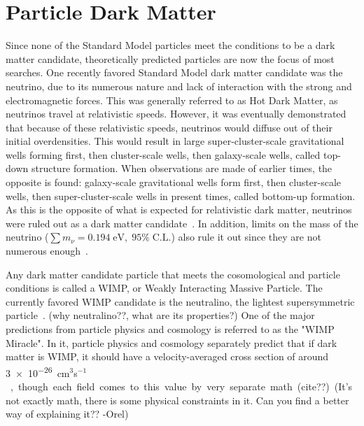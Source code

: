 \section{Particle Dark Matter}\label{sec_particledm}

  Since none of the Standard Model particles meet the conditions to be a dark matter candidate, theoretically predicted particles are now the focus of most searches.
  One recently favored Standard Model dark matter candidate was the neutrino, due to its numerous nature and lack of interaction with the strong and electromagnetic forces.
  This was generally referred to as Hot Dark Matter, as neutrinos travel at relativistic speeds.
  However, it was eventually demonstrated that because of these relativistic speeds, neutrinos would diffuse out of their initial overdensities.
  This would result in large super-cluster-scale gravitational wells forming first, then cluster-scale wells, then galaxy-scale wells, called top-down structure formation.
  When observations are made of earlier times, the opposite is found: galaxy-scale gravitational wells form first, then cluster-scale wells, then super-cluster-scale wells in present times, called bottom-up formation.
  As this is the opposite of what is expected for relativistic dark matter, neutrinos were ruled out as a dark matter candidate~\cite{neutrinoHeirarchical}.
  In addition, limits on the mass of the neutrino ($\sum{}m_{\nu} = 0.194 \; \textrm{eV}, \; 95\% \; \textrm{C.L.}$) also rule it out since they are not numerous enough~\cite{planck2015}.
  
  
  Any dark matter candidate particle that meets the cosomological and particle conditions is called a WIMP, or Weakly Interacting Massive Particle.
  The currently favored WIMP candidate is the neutralino, the lightest supersymmetric particle~\cite{neutralino1}.
  {\color{red}(why neutralino??, what are its properties?)}
  One of the major predictions from particle physics and cosmology is referred to as the "WIMP Miracle".
  In it, particle physics and cosmology separately predict that if dark matter is WIMP, it should have a velocity-averaged cross section of around \SI{3e-26}{cm$^3$s$^{-1}$}, though each field comes to this value by very separate math. {\color{red}(cite??)}
  {\color{red}(It's not exactly math, there is some physical constraints in it. Can you find a better way of explaining it?? -Orel)}

